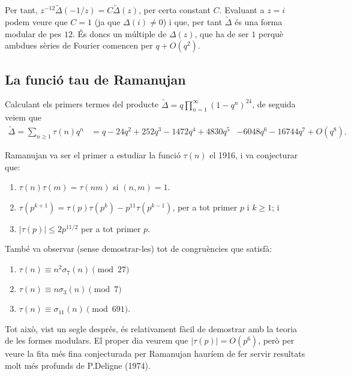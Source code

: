 \documentclass[
  letterpaper,
  DIV=11,
  numbers=noendperiod]{scrreprt}
\providecommand{\tightlist}{%
  \setlength{\itemsep}{0pt}\setlength{\parskip}{0pt}}\usepackage{longtable,booktabs,array}
\theoremstyle{plain}
\theoremstyle{plain}
\theoremstyle{definition}
\theoremstyle{plain}
\theoremstyle{plain}
\theoremstyle{definition}
\theoremstyle{remark}
\begin{document}
Per tant, \(z^{-12}\tilde\Delta(-1/z) = C \tilde\Delta(z)\), per certa
constant \(C\). Evaluant a \(z=i\) podem veure que \(C=1\) (ja que
\(\Delta(i)\neq 0\)) i que, per tant \(\tilde\Delta\) és una forma
modular de pes \(12\). És doncs un múltiple de \(\Delta(z)\), que ha de
ser \(1\) perquè ambdues sèries de Fourier comencen per \(q+O(q^2)\).

\subsection{La funció tau de
Ramanujan}\label{la-funciuxf3-tau-de-ramanujan}

Calculant els primers termes del producte
\(\tilde\Delta=q\prod_{n=1}^\infty(1-q^n)^{24}\), de seguida veiem que
\begin{align*}
\tilde\Delta = \sum_{n\geq 1} \tau(n)q^n &= q - 24 q^{2} + 252 q^{3} - 1472 q^{4} + 4830 q^{5}
&- 6048 q^{6} - 16744 q^{7} + O(q^{8}).
\end{align*}

Ramanujan va ser el primer a estudiar la funció \(\tau(n)\) el 1916, i
va conjecturar que:

\begin{enumerate}
\def\labelenumi{\arabic{enumi}.}
\tightlist
\item
  \(\tau(n)\tau(m)=\tau(nm)\) si \((n,m)=1\).
\item
  \(\tau(p^{k+1}) = \tau(p)\tau(p^k) - p^{11}\tau(p^{k-1})\), per a tot
  primer \(p\) i \(k\geq 1\); i
\item
  \(|\tau(p)| \leq 2p^{11/2}\) per a tot primer \(p\).
\end{enumerate}

També va observar (sense demostrar-les) tot de congruències que satisfà:

\begin{enumerate}
\def\labelenumi{\arabic{enumi}.}
\tightlist
\item
  \(\tau(n)\equiv n^2\sigma_7(n)\pmod{27}\)
\item
  \(\tau(n)\equiv n\sigma_3(n)\pmod{7}\)
\item
  \(\tau(n)\equiv \sigma_{11}(n)\pmod{691}\).
\end{enumerate}

Tot això, vist un segle després, és relativament fàcil de demostrar amb
la teoria de les formes modulars. El proper dia veurem que
\(|\tau(p)| =O(p^6)\), però per veure la fita més fina conjecturada per
Ramanujan hauríem de fer servir resultats molt més profunds de P.Deligne
(1974).
\end{document}
